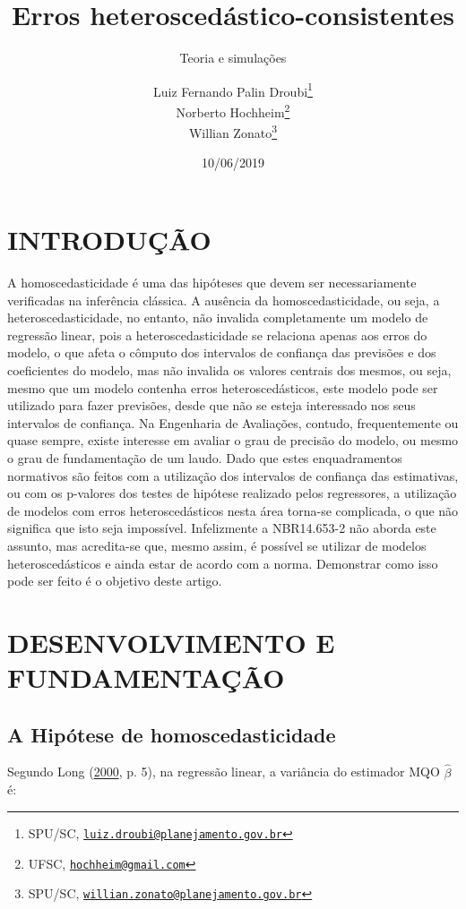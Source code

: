 \documentclass[a4paper, 12pt]{article}
\title{Erros heteroscedástico-consistentes}
\subtitle{Teoria e simulações}
\author{Luiz Fernando Palin Droubi\footnote{SPU/SC,
  \href{mailto:luiz.droubi@planejamento.gov.br}{\nolinkurl{luiz.droubi@planejamento.gov.br}}} \\ Norberto Hochheim\footnote{UFSC,
  \href{mailto:hochheim@gmail.com}{\nolinkurl{hochheim@gmail.com}}} \\ Willian Zonato\footnote{SPU/SC,
  \href{mailto:willian.zonato@planejamento.gov.br}{\nolinkurl{willian.zonato@planejamento.gov.br}}}}
\date{10/06/2019}
\begin{document}
\maketitle

\hypertarget{introducao}{%
\section{INTRODUÇÃO}\label{introducao}}

A homoscedasticidade é uma das hipóteses que devem ser necessariamente
verificadas na inferência clássica. A ausência da homoscedasticidade, ou
seja, a heteroscedasticidade, no entanto, não invalida completamente um
modelo de regressão linear, pois a heteroscedasticidade se relaciona
apenas aos erros do modelo, o que afeta o cômputo dos intervalos de
confiança das previsões e dos coeficientes do modelo, mas não invalida
os valores centrais dos mesmos, ou seja, mesmo que um modelo contenha
erros heteroscedásticos, este modelo pode ser utilizado para fazer
previsões, desde que não se esteja interessado nos seus intervalos de
confiança. Na Engenharia de Avaliações, contudo, frequentemente ou quase
sempre, existe interesse em avaliar o grau de precisão do modelo, ou
mesmo o grau de fundamentação de um laudo. Dado que estes enquadramentos
normativos são feitos com a utilização dos intervalos de confiança das
estimativas, ou com os p-valores dos testes de hipótese realizado pelos
regressores, a utilização de modelos com erros heteroscedásticos nesta
área torna-se complicada, o que não significa que isto seja impossível.
Infelizmente a NBR14.653-2 não aborda este assunto, mas acredita-se que,
mesmo assim, é possível se utilizar de modelos heteroscedásticos e ainda
estar de acordo com a norma. Demonstrar como isso pode ser feito é o
objetivo deste artigo.

\hypertarget{desenvolvimento-e-fundamentacao}{%
\section{DESENVOLVIMENTO E
FUNDAMENTAÇÃO}\label{desenvolvimento-e-fundamentacao}}

\hypertarget{a-hipotese-de-homoscedasticidade}{%
\subsection{A Hipótese de
homoscedasticidade}\label{a-hipotese-de-homoscedasticidade}}

Segundo Long (\protect\hyperlink{ref-Long}{2000}, p. 5), na regressão
linear, a variância do estimador MQO \(\hat{\beta}\) é:
\end{document}
